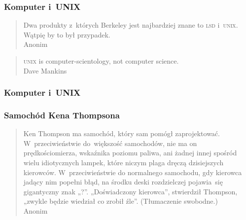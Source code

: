 \documentclass[10pt,t]{beamer}
\begin{document}
\begin{frame}
  \frametitle{Komputer i~UNIX}


  \begin{quote}

    Dwa produkty z~których Berkeley jest najbardziej znane to \textsc{lsd}
    i~\textsc{unix}. Wątpię by to był przypadek. \\
    Anonim

  \end{quote}

  \vspace{2em}





  \begin{quote}

    \textsc{unix} is computer-scientology, not computer science. \\
    Dave Mankins

  \end{quote}

\end{frame}





\begin{frame}
  \frametitle{Komputer i~UNIX}


  \begin{quote}



  \end{quote}

\end{frame}





\begin{frame}
  \frametitle{Samochód Kena Thompsona}


  \begin{quote}

    Ken Thompson ma samochód, który sam pomógł zaprojektować.
    W~przeciwieństwie do~większość samochodów, nie ma on prędkościomierza,
    wskaźnika poziomu paliwa, ani żadnej innej spośród wielu idiotycznych
    lampek, które niczym plaga dręczą dzisiejszych kierowców.
    W~przeciwieństwie do normalnego samochodu, gdy kierowca jadący nim
    popełni błąd, na środku deski rozdzielczej pojawia~się
    gigantyczny znak „?”. „Doświadczony kierowca”, stwierdził Thompson,
    „zwykle będzie wiedział co zrobił źle”. (Tłumaczenie swobodne.) \\
    Anonim

  \end{quote}

\end{frame}
\end{document}
